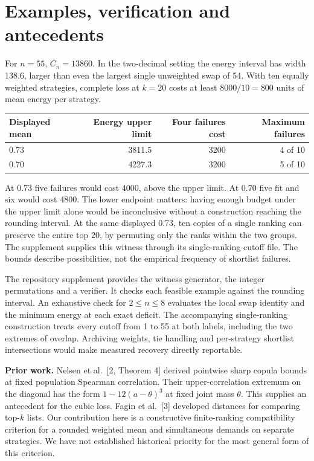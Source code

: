 \documentclass[11pt]{article}
\begin{document}
\section{Examples, verification and antecedents}
For $n=55$, $C_n=13860$. In the two-decimal setting the energy interval has width 138.6, larger than even the largest single unweighted swap of 54. With ten equally weighted strategies, complete loss at $k=20$ costs at least $8000/10=800$ units of mean energy per strategy.
\begin{center}\begin{tabular}{lrrr}\toprule
Displayed mean & Energy upper limit & Four failures cost & Maximum failures\\\midrule
0.73 & 3811.5 & 3200 & 4 of 10\\
0.70 & 4227.3 & 3200 & 5 of 10\\\bottomrule
\end{tabular}\end{center}
At 0.73 five failures would cost 4000, above the upper limit. At 0.70 five fit and six would cost 4800. The lower endpoint matters: having enough budget under the upper limit alone would be inconclusive without a construction reaching the rounding interval. At the same displayed 0.73, ten copies of a single ranking can preserve the entire top 20, by permuting only the ranks within the two groups. The supplement supplies this witness through its single-ranking cutoff file. The bounds describe possibilities, not the empirical frequency of shortlist failures.

The repository supplement provides the witness generator, the integer permutations and a verifier. It checks each feasible example against the rounding interval. An exhaustive check for $2\le n\le8$ evaluates the local swap identity and the minimum energy at each exact deficit. The accompanying single-ranking construction treats every cutoff from 1 to 55 at both labels, including the two extremes of overlap. Archiving weights, tie handling and per-strategy shortlist intersections would make measured recovery directly reportable.

\textbf{Prior work.} Nelsen et al.\ [2, Theorem 4] derived pointwise sharp copula bounds at fixed population Spearman correlation. Their upper-correlation extremum on the diagonal has the form $1-12(a-\theta)^3$ at fixed joint mass $\theta$. This supplies an antecedent for the cubic loss. Fagin et al.\ [3] developed distances for comparing top-$k$ lists. Our contribution here is a constructive finite-ranking compatibility criterion for a rounded weighted mean and simultaneous demands on separate strategies. We have not established historical priority for the most general form of this criterion.
\end{document}
